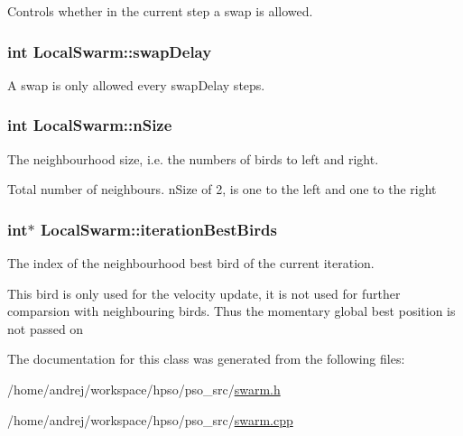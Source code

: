 Controls whether in the current step a swap is allowed. 

\hypertarget{classLocalSwarm_18972161a1402048e67aa08b526ce7dc}{
\subsubsection{\setlength{\rightskip}{0pt plus 5cm}int {\bf LocalSwarm::swapDelay}}}
\label{classLocalSwarm_18972161a1402048e67aa08b526ce7dc}


A swap is only allowed every swapDelay steps. 

\hypertarget{classLocalSwarm_a9277a2e88b83081d3ee8338c856eaeb}{
\subsubsection{\setlength{\rightskip}{0pt plus 5cm}int {\bf LocalSwarm::nSize}}}
\label{classLocalSwarm_a9277a2e88b83081d3ee8338c856eaeb}


The neighbourhood size, i.e. the numbers of birds to left and right. 

Total number of neighbours. nSize of 2, is one to the left and one to the right \hypertarget{classLocalSwarm_6364776b43399f20b45a2f795937bde0}{
\subsubsection{\setlength{\rightskip}{0pt plus 5cm}int$\ast$ {\bf LocalSwarm::iterationBestBirds}}}
\label{classLocalSwarm_6364776b43399f20b45a2f795937bde0}


The index of the neighbourhood best bird of the current iteration. 

This bird is only used for the velocity update, it is not used for further comparsion with neighbouring birds. Thus the momentary global best position is not passed on 

The documentation for this class was generated from the following files:\begin{CompactItemize}
\item 
/home/andrej/workspace/hpso/pso\_\-src/\hyperlink{swarm_8h}{swarm.h}\item 
/home/andrej/workspace/hpso/pso\_\-src/\hyperlink{swarm_8cpp}{swarm.cpp}\end{CompactItemize}
